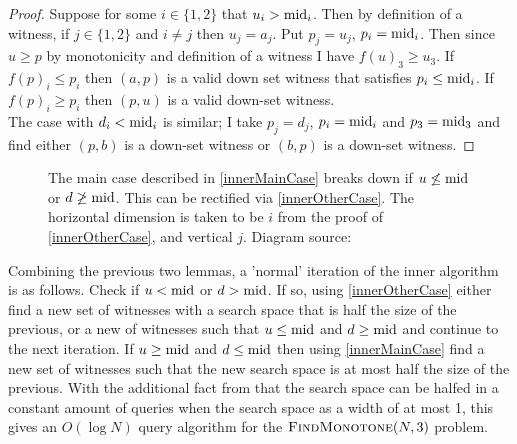 \begin{proof}
  Suppose for some $i \in \{1, 2\}$ that $u_i > \mathrm{mid}_i$. Then
  by definition of a witness, if $j \in \{1, 2\}$ and $i \neq j$ then $u_j = a_j$.
  Put $p_j = u_j$, $p_i = \mathrm{mid}_i$. Then since $u \geq p$ by monotonicity
  and definition of a witness I have $f(u)_3 \geq u_3$. If $f(p)_i \leq p_i$ then
  $(a, p)$ is a valid down set witness that satisfies $p_i \leq \mathrm{mid}_i$. If
  $f(p)_i \geq p_i$ then $(p, u)$ is a valid down-set witness. \\
  The case with $d_i < \mathrm{mid}_i$ is similar; I take $p_j = d_j$, $p_i = \mathrm{mid}_i$ and $p_3 = \mathrm{mid}_3$
  and find either $(p, b)$ is a down-set witness or $(b, p)$ is a down-set witness.
\end{proof}
\vspace{-10pt}
\begin{figure}[ht]
  \centering
  \scalebox{0.4}{}
  \caption{The main case described in \cref{innerMainCase} breaks down if $u \not\leq \mathrm{mid}$ or $d \not\geq \mathrm{mid}$.
  This can be rectified via \cref{innerOtherCase}. The horizontal dimension is taken
  to be $i$ from the proof of \cref{innerOtherCase}, and vertical $j$. Diagram source: \citep{fasterTarski}}
\end{figure}
Combining
the previous two lemmas, a 'normal' iteration of the inner algorithm is as follows.
Check if $u < \mathrm{mid}$ or $d > \mathrm{mid}$. If so, using \cref{innerOtherCase} either find a new
set of witnesses with a search space that is half the size of the previous, or a new of
witnesses such that $u \leq \mathrm{mid}$ and $d \geq \mathrm{mid}$ and continue to the next iteration.
If $u \geq \mathrm{mid}$ and $d \leq \mathrm{mid}$ then using \cref{innerMainCase} find a new set of witnesses
such that the new search space is at most half the size of the previous.
With the additional fact from \citep{fasterTarski} that the search space can be halfed in a constant amount of
queries when the search space as a width of at most 1, this gives an $O(\log N)$ query algorithm
for the $\textsc{FindMonotone}(N, 3)$ problem.


